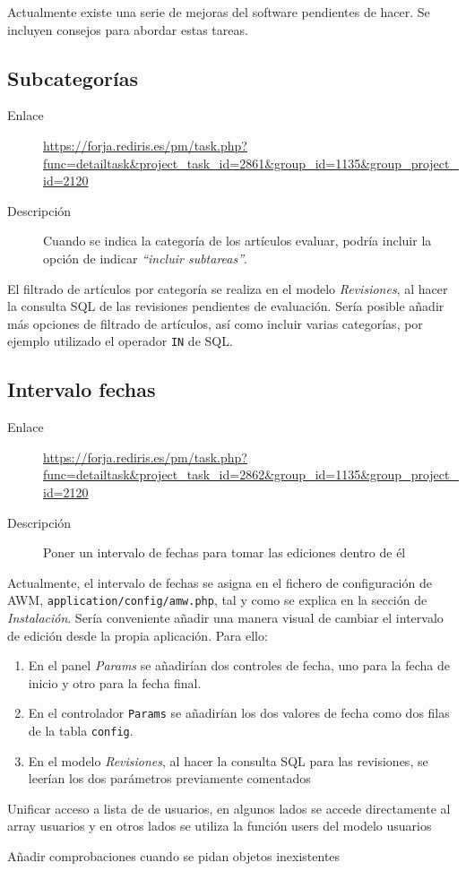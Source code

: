 \documentclass[11pt]{article}
\begin{document}
Actualmente existe una serie de mejoras del software pendientes de hacer. Se
incluyen consejos para abordar estas tareas.

\subsection{Subcategorías}

\begin{description}
\item[Enlace] \url{https://forja.rediris.es/pm/task.php?func=detailtask&project_task_id=2861&group_id=1135&group_project_id=2120}
\item[Descripción] Cuando se indica la categoría de los artículos evaluar,
  podría incluir la opción de indicar \textit{``incluir subtareas''}.
\end{description}

El filtrado de artículos por categoría se realiza en el modelo
\textit{Revisiones}, al hacer la consulta SQL de las revisiones pendientes de
evaluación. Sería posible añadir más opciones de filtrado de artículos, así como
incluir varias categorías, por ejemplo utilizado el operador \texttt{IN} de SQL.


\subsection{Intervalo fechas}

\begin{description}
\item[Enlace] \url{https://forja.rediris.es/pm/task.php?func=detailtask&project_task_id=2862&group_id=1135&group_project_id=2120}
\item[Descripción] Poner un intervalo de fechas para tomar las ediciones dentro de él
\end{description}

Actualmente, el intervalo de fechas se asigna en el fichero de configuración de
AWM, \texttt{application/config/amw.php}, tal y como se explica en la sección de
\textit{Instalación}. Sería conveniente añadir una manera visual de cambiar el
intervalo de edición desde la propia aplicación. Para ello:

\begin{enumerate}
\item En el panel \textit{Params} se añadirían dos controles de fecha, uno para
  la fecha de inicio y otro para la fecha final.
\item En el controlador \texttt{Params} se añadirían los dos valores de fecha
  como dos filas de la tabla \texttt{config}.
\item En el modelo \textit{Revisiones}, al hacer la consulta SQL para las
  revisiones, se leerían los dos parámetros previamente comentados
\end{enumerate}



Unificar acceso a lista de de usuarios, en algunos lados se accede directamente
al array usuarios y en otros lados se utiliza la función users del modelo usuarios

Añadir comprobaciones cuando se pidan objetos inexistentes
\end{document}
